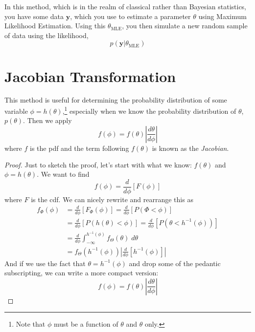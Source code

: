 \documentclass[a4paper,12pt]{scrartcl}
\begin{document}
In this method, which is in the realm of classical rather than Bayesian
statistics, you have some data $\mathbf{y}$, which you use to estimate
a parameter $\theta$ using Maximum Likelihood Estimation. Using
this $\theta_{\text{MLE}}$, you then simulate a new random sample of 
data using the likelihood,
\[ p(\mathbf{y} | \theta_{\text{MLE}}) \]

\section{Jacobian Transformation}

This method is useful for determining the probability distribution
of some variable $\phi = h(\theta)$,\footnote{Note that $\phi$ must be a 
function of $\theta$ and $\theta$ only.} especially
when we know the probability distribution 
of $\theta$, $p(\theta)$.  Then we apply
   \[ f(\phi) = f(\theta) \left\lvert 
      \frac{d\theta}{d\phi} \right\rvert \]
where $f$ is the pdf and the term following $f(\theta)$ is known as 
the \emph{Jacobian}.

\begin{proof} 
   Just to sketch the proof, let's start with what we know:
   $f(\theta)$ and $\phi = h(\theta)$. We want to find
      \[ f(\phi) = \frac{d}{d\phi} \left[ F(\phi) \right] \]
   where $F$ is the cdf. We can nicely rewrite and rearrange this as
   \begin{align*}
      f_\Phi(\phi) &= \frac{d}{d\phi} 
      \left[ F_\Phi(\phi) \right] = 
      \frac{d}{d\phi} \left[ P(\Phi < \phi ) \right]
      \\
      &= \frac{d}{d\phi} \left[ P( h(\theta) < \phi ) \right]
	 = \frac{d}{d\phi} \left[ P( \theta < h^{-1}(\phi) )  \right]
      \\ 
      &= \frac{d}{d\phi} \int^{h^{-1}(\phi)}_{-\infty} 
	 f_\Theta(\theta)\; d\theta
      \\
      &= f_\Theta\left( h^{-1}(\phi) \right) \left\lvert 
	 \frac{d}{d\phi} \left[ h^{-1}(\phi) \right] \right\rvert
   \end{align*}
And if we use the fact that $\theta = h^{-1}(\phi)$ and drop some of the
pedantic subscripting, we can write a more compact version:
   \[ f(\phi) = f(\theta) \left\lvert 
      \frac{d\theta}{d\phi} \right\rvert\]

\end{proof}
\end{document}
